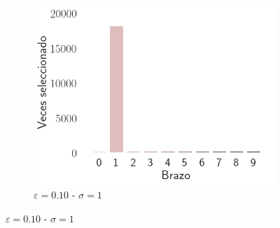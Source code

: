 \documentclass[12pt]{article}
\begin{document}
\begin{figure}[h]
\begin{subfigure}[H]{0.3\textwidth}
            \includegraphics[width=\textwidth]{../img/arm_sigma_1_epsilon_0.1}
            \caption{$\varepsilon=0.10$ - $\sigma=1$}
            \label{fig:arms_selected_1_0.1}
        \end{subfigure}


\end{figure}
\end{document}
